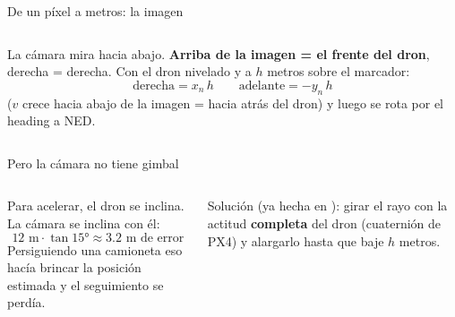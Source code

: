 \begin{frame}{De un píxel a metros: la imagen}
  \begin{columns}[c]
    \centering
    \small
    La cámara mira hacia abajo. \textbf{Arriba de la imagen = el frente del dron}, derecha = derecha.
    Con el dron nivelado y a $h$ metros sobre el marcador:
    \[ \text{derecha} = x_n\,h \qquad \text{adelante} = -y_n\,h \]
    ($v$ crece hacia abajo de la imagen = hacia atrás del dron) y luego se rota por el heading a NED.
  \end{columns}
\end{frame}

\begin{frame}{Pero la cámara no tiene gimbal}
  \begin{columns}[c]
    \centering
    \small
    Para acelerar, el dron se inclina. La cámara se inclina con él:
    \[ 12\text{ m} \cdot \tan 15° \approx 3.2\text{ m de error} \]
    Persiguiendo una camioneta eso hacía brincar la posición estimada y el seguimiento se perdía.
    \begin{idea}
      \small Solución (ya hecha en ): girar el rayo con la actitud \textbf{completa}
      del dron (cuaternión de PX4) y alargarlo hasta que baje $h$ metros.
    \end{idea}
  \end{columns}
\end{frame}

